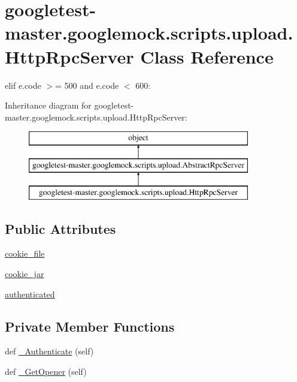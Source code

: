 \hypertarget{classgoogletest-master_1_1googlemock_1_1scripts_1_1upload_1_1_http_rpc_server}{}\section{googletest-\/master.googlemock.\+scripts.\+upload.\+Http\+Rpc\+Server Class Reference}
\label{classgoogletest-master_1_1googlemock_1_1scripts_1_1upload_1_1_http_rpc_server}


elif e.\+code $>$= 500 and e.\+code $<$ 600\+:  


Inheritance diagram for googletest-\/master.googlemock.\+scripts.\+upload.\+Http\+Rpc\+Server\+:\begin{figure}[H]
\begin{center}
\leavevmode
\includegraphics[height=3.000000cm]{d7/de3/classgoogletest-master_1_1googlemock_1_1scripts_1_1upload_1_1_http_rpc_server}
\end{center}
\end{figure}
\subsection*{Public Attributes}
\begin{DoxyCompactItemize}
\item 
\mbox{\hyperlink{classgoogletest-master_1_1googlemock_1_1scripts_1_1upload_1_1_http_rpc_server_a7330007513330522a4408110bd101e32}{cookie\+\_\+file}}
\item 
\mbox{\hyperlink{classgoogletest-master_1_1googlemock_1_1scripts_1_1upload_1_1_http_rpc_server_ada9084a23bf5e96972b668be8d567dfa}{cookie\+\_\+jar}}
\item 
\mbox{\hyperlink{classgoogletest-master_1_1googlemock_1_1scripts_1_1upload_1_1_http_rpc_server_a0aa847133239fa6402a3e0b11099f579}{authenticated}}
\end{DoxyCompactItemize}
\subsection*{Private Member Functions}
\begin{DoxyCompactItemize}
\item 
def \mbox{\hyperlink{classgoogletest-master_1_1googlemock_1_1scripts_1_1upload_1_1_http_rpc_server_a1d68326ecc376f22a5509fd753498558}{\+\_\+\+Authenticate}} (self)
\item 
def \mbox{\hyperlink{classgoogletest-master_1_1googlemock_1_1scripts_1_1upload_1_1_http_rpc_server_ac57e60db325e4eb4e75eac9cd6152eeb}{\+\_\+\+Get\+Opener}} (self)
\end{DoxyCompactItemize}
